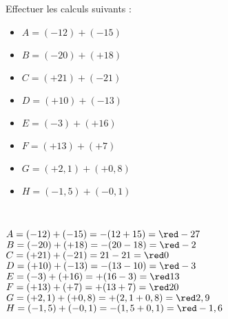 \begin{exercice*}
   Effectuer les calculs suivants :   
      \begin{itemize}
         \item[] $A =(-12)+(-15)$
         \item[] $B =(-20)+(+18)$
         \item[] $C =(+21)+(-21)$
         \item[] $D =(+10)+(-13)$
         \item[] $E =(-3)+(+16)$
         \item[] $F =(+13)+(+7)$
         \item[] $G =(+2,1)+(+0,8)$
         \item[] $H =(-1,5)+(-0,1)$
      \end{itemize}   
\end{exercice*}

\begin{corrige}
   \ \\ [-5mm]
   \begin{itemize}
      \def\item{}
      \item $A =(-12)+(-15) =-(12+15) ={\red -27}$ \smallskip
      \item $B =(-20)+(+18) =-(20-18) ={\red -2}$ \smallskip
      \item $C =(+21)+(-21) =21-21 ={\red 0}$ \smallskip
      \item $D =(+10)+(-13) =-(13-10) ={\red -3}$ \smallskip
      \item $E =(-3)+(+16) =+(16-3) ={\red 13}$ \smallskip
      \item $F =(+13)+(+7) =+(13+7) ={\red 20}$ \smallskip
      \item $G =(+2,1)+(+0,8) =+(2,1+0,8) ={\red 2,9}$ \smallskip
      \item $H =(-1,5)+(-0,1) =-(1,5+0,1) ={\red -1,6}$
   \end{itemize}
\end{corrige}
